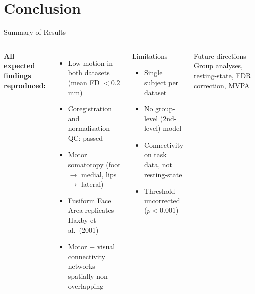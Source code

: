\documentclass[aspectratio=169]{beamer}
\begin{document}
\section{Conclusion}

\begin{frame}{Summary of Results}
  \begin{columns}
      \textbf{All expected findings reproduced:}
      \begin{itemize}
        \item Low motion in both datasets (mean FD $<0.2$\,mm)
        \item Coregistration and normalisation QC: passed
        \item Motor somatotopy (foot $\to$ medial, lips $\to$ lateral)
        \item Fusiform Face Area replicates Haxby et al.\ (2001)
        \item Motor + visual connectivity networks spatially non-overlapping
      \end{itemize}
      \begin{alertblock}{Limitations}
        \begin{itemize}
          \item Single subject per dataset
          \item No group-level (2nd-level) model
          \item Connectivity on task data, not resting-state
          \item Threshold uncorrected ($p<0.001$)
        \end{itemize}
      \end{alertblock}
      \vspace{0.3em}
      \begin{block}{Future directions}
        Group analyses, resting-state, FDR correction, MVPA
      \end{block}
  \end{columns}
\end{frame}
\end{document}
